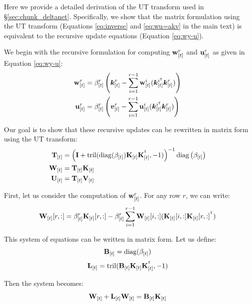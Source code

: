 \label{appendix:ut_transform}

Here we provide a detailed derivation of the UT transform used in \S\ref{sec:chunk_deltanet}. Specifically, we show that the matrix formulation using the UT transform (Equations \ref{eq:inverse} and \ref{eq:wu=akv} in the main text) is equivalent to the recursive update equations (Equation \ref{eq:wy-u}).

We begin with the recursive formulation for computing $\mathbf{w}_{[t]}^r$ and $\mathbf{u}_{[t]}^r$ as given in Equation \ref{eq:wy-u}:
\begin{align*}
    \vw_{[t]}^r &= \beta_{[t]}^r \left(\vk_{[t]}^r -  \sum_{i=1}^{r-1} \vw_{[t]}^i (\vk_{[t]}^{i\intercal}\vk_{[t]}^r)  \right) \\
    \vu_{[t]}^r &= \beta_{[t]}^r \left(\vv_{[t]}^r -  \sum_{i=1}^{r-1} \vu_{[t]}^i (\vk_{[t]}^{i\intercal}\vk_{[t]}^r)  \right)
\end{align*}

Our goal is to show that these recursive updates can be rewritten in matrix form using the UT transform:
\begin{align*}
    \rmT_{[t]} &= \left(\rmI + \operatorname{tril}(\operatorname{diag}(\beta_{[t]})\rmK_{[t]} \rmK_{[t]}^\intercal,-1)\right)^{-1}\operatorname{diag}\left(\beta_{[t]}\right) \\
    \rmW_{[t]} &= \rmT_{[t]} \rmK_{[t]} \\
    \rmU_{[t]} &= \rmT_{[t]} \rmV_{[t]}
\end{align*}

First, let us consider the computation of $\mathbf{w}_{[t]}^r$. For any row $r$, we can write:
\begin{equation*}
    \rmW_{[t]}[r,:] = \beta_{[t]}^r \rmK_{[t]}[r,:] - \beta_{[t]}^r \sum_{i=1}^{r-1} \rmW_{[t]}[i,:] (\rmK_{[t]}[i,:]\rmK_{[t]}[r,:]^\intercal)
\end{equation*}

This system of equations can be written in matrix form. Let us define:
\begin{equation*}
    {\mathbf{B}}_{[t]} = \operatorname{diag}(\beta_{[t]})
\end{equation*}
\begin{equation*}
    \rmL_{[t]} = \operatorname{tril}(\rmB_{[t]}\rmK_{[t]}\rmK_{[t]}^\intercal, -1)
\end{equation*}

Then the system becomes:
\begin{equation*}
    {\mathbf{W}}_{[t]} + {\mathbf{L}}_{[t]}{\mathbf{W}}_{[t]} = {\mathbf{B}}_{[t]}{\mathbf{K}}_{[t]}
\end{equation*}

